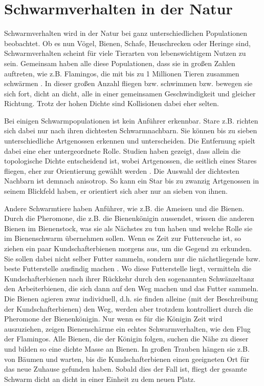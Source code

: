 \documentclass[draft=false
              ,paper=a4
              ,twoside=false
              ,fontsize=11pt
              ,headsepline
              ,BCOR10mm
              ,DIV11
              ,bibtotoc
              ,liststotoc
              ]{scrbook}
\begin{document}
\section{Schwarmverhalten in der Natur}
Schwarmverhalten wird in der Natur bei ganz unterschiedlichen Populationen beobachtet. Ob es nun Vögel, Bienen, Schafe, Heuschrecken oder Heringe sind, Schwarmverhalten scheint für viele Tierarten von lebenswichtigem Nutzen zu sein.
Gemeinsam haben alle diese Populationen, dass sie in großen Zahlen auftreten, wie z.B. Flamingos, die mit bis zu 1 Millionen Tieren zusammen schwärmen \cite{flamingo}.
In dieser großen Anzahl fliegen bzw. schwimmen bzw. bewegen sie sich fort, dicht an dicht, alle in einer gemeinsamen Geschwindigkeit und gleicher Richtung. Trotz der hohen Dichte sind Kollisionen dabei eher selten.

Bei einigen Schwarmpopulationen ist kein Anführer erkennbar. Stare z.B. richten sich dabei nur nach ihren dichtesten Schwarmnachbarn. Sie können bis zu sieben unterschiedliche Artgenossen erkennen und unterscheiden. Die Entfernung spielt dabei eine eher untergeordnete Rolle. Studien haben gezeigt, dass allein die topologische Dichte entscheidend ist, wobei Artgenossen, die seitlich eines Stares fliegen, eher zur Orientierung gewählt werden \cite{Camperi715}. Die Auswahl der dichtesten Nachbarn ist demnach anisotrop. So kann ein Star bis zu zwanzig Artgenossen in seinem Blickfeld haben, er orientiert sich aber nur an sieben von ihnen.

Andere Schwarmtiere haben Anführer, wie z.B. die Ameisen und die Bienen. Durch die Pheromone, die z.B. die Bienenkönigin aussendet, wissen die anderen Bienen im Bienenstock, was sie als Nächstes zu tun haben und welche Rolle sie im Bienenschwarm übernehmen sollen. Wenn es Zeit zur Futtersuche ist, so ziehen ein paar Kundschafterbienen morgens aus, um die Gegend zu erkunden. Sie sollen dabei nicht selber Futter sammeln, sondern nur die nächstliegende bzw. beste Futterstelle ausfindig machen \cite{bees}. Wo diese Futterstelle liegt, vermitteln die Kundschafterbienen nach ihrer Rückkehr durch den sogenannten Schwänzeltanz den Arbeiterbienen, die sich dann auf den Weg machen und das Futter sammeln. Die Bienen agieren zwar individuell, d.h. sie finden alleine (mit der Beschreibung der Kundschafterbienen) den Weg, werden aber trotzdem kontrolliert durch die Pheromone der Bienenkönigin.
Nur wenn es für die Königin Zeit wird auszuziehen, zeigen Bienenschärme ein echtes Schwarmverhalten, wie den Flug der Flamingos. Alle Bienen, die der Königin folgen, suchen die Nähe zu dieser und bilden so eine dichte Masse an Bienen. In großen Trauben hängen sie z.B. von Bäumen und warten, bis die Kundschafterbienen einen geeigneten Ort für das neue Zuhause gefunden haben. Sobald dies der Fall ist, fliegt der gesamte Schwarm dicht an dicht in einer Einheit zu dem neuen Platz.
\end{document}
